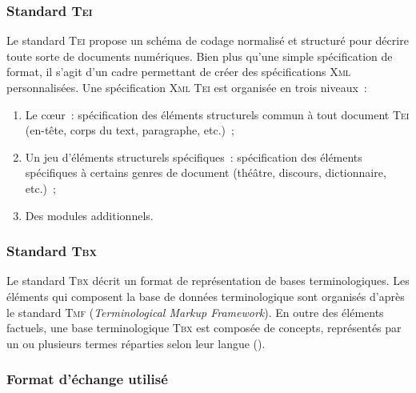       \subsubsection{Standard \textsc{Tei}}
      \label{subsubsec:main-automatic_evaluation_of_keyphrase_annotation-methodology-data_format-tei}
        Le standard \textsc{Tei} propose un schéma de codage normalisé et
        structuré pour décrire toute sorte de documents numériques. Bien plus
        qu'une simple spécification de format, il s'agit d'un cadre permettant
        de créer des spécifications \textsc{Xml} personnalisées. Une
        spécification \textsc{Xml} \textsc{Tei} est organisée en trois niveaux~:
        \begin{enumerate}
          \item{Le c\oe{}ur~: spécification des éléments structurels commun à
                tout document \textsc{Tei} (en-tête, corps du text, paragraphe,
                etc.)~;}
          \item{Un jeu d'éléments structurels spécifiques~: spécification des
                éléments spécifiques à certains genres de document (théâtre,
                discours, dictionnaire, etc.)~;}
          \item{Des modules additionnels.}
        \end{enumerate}


      \subsubsection{Standard \textsc{Tbx}}
      \label{subsubsec:main-automatic_evaluation_of_keyphrase_annotation-methodology-data_format-tbx}
        Le standard \textsc{Tbx} décrit un format de représentation de bases
        terminologiques. Les éléments qui composent la base de données
        terminologique sont organisés d'après le standard \textsc{Tmf}
        (\textit{Terminological Markup Framework}). En outre des éléments
        factuels, une base terminologique \textsc{Tbx} est composée de concepts,
        représentés par un ou plusieurs termes réparties selon leur langue
        ().

        \TODO{\dots}


      \subsubsection{Format d'échange utilisé}
      \label{subsubsec:main-automatic_evaluation_of_keyphrase_annotation-methodology-data_format-final_format}
        \TODO{\dots}

